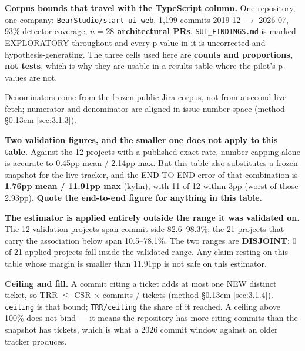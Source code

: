\documentclass[11pt,a4paper]{article}
\begin{document}
\addtocounter{table}{-1}

\endgroup

\textbf{Corpus bounds that travel with the TypeScript column.} One repository, one company: \texttt{BearStudio/\allowbreak{}start-\allowbreak{}ui-\allowbreak{}web}, 1,199 commits 2019-12 $\rightarrow$ 2026-07, 93\% detector coverage, \textbf{$n=28$ architectural PRs}. \texttt{SUI\_\allowbreak{}FINDINGS.\allowbreak{}md} is marked EXPLORATORY throughout and every p-value in it is uncorrected and hypothesis-generating. The three cells used here are \textbf{counts and proportions, not tests}, which is why they are usable in a results table where the pilot's p-values are not.





\begin{landscape}

Denominators come from the frozen public Jira corpus, not from a second live fetch; numerator and denominator are aligned in issue-number space (method \S\kern0.13em \ref{sec:3.1.3}).



\textbf{Two validation figures, and the smaller one does not apply to this table.} Against the 12 projects with a published exact rate, number-capping alone is accurate to 0.45pp mean / 2.14pp max. But this table also substitutes a frozen snapshot for the live tracker, and the END-TO-END error of that combination is \textbf{1.76pp mean / 11.91pp max} (kylin), with 11 of 12 within 3pp (worst of those 2.93pp). \textbf{Quote the end-to-end figure for anything in this table.}



\textbf{The estimator is applied entirely outside the range it was validated on.} The 12 validation projects span commit-side 82.6--98.3\%; the 21 projects that carry the association below span 10.5--78.1\%. The two ranges are \textbf{DISJOINT}: 0 of 21 applied projects fall inside the validated range. Any claim resting on this table whose margin is smaller than 11.91pp is not safe on this estimator.



\textbf{Ceiling and fill.} A commit citing a ticket adds at most one NEW distinct ticket, so TRR $\leq$ CSR $\times$ commits / tickets (method \S\kern0.13em \ref{sec:3.1.4}). \texttt{ceiling} is that bound; \texttt{TRR/\allowbreak{}ceiling} the share of it reached. A ceiling above 100\% does not bind --- it means the repository has more citing commits than the snapshot has tickets, which is what a 2026 commit window against an older tracker produces.




\end{landscape}
\end{document}
